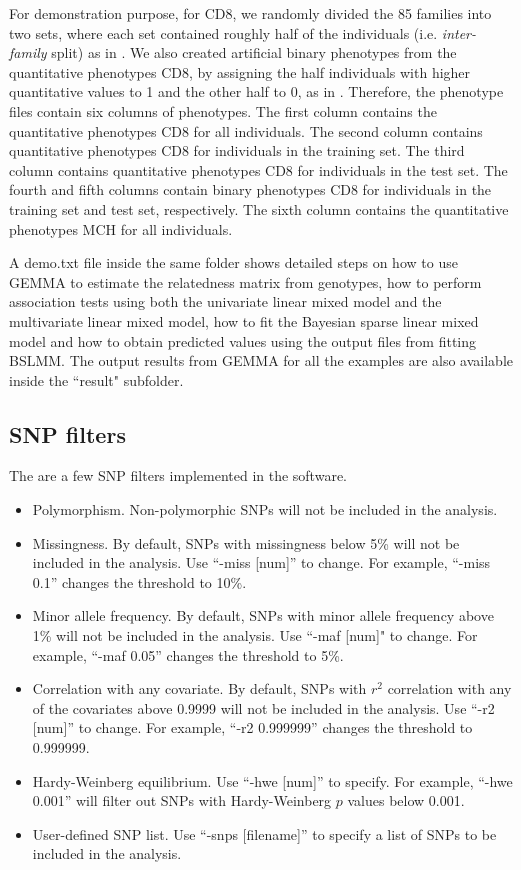 \documentclass[11pt]{article}
\begin{document}
For demonstration purpose, for CD8, we randomly divided the 85 families into two sets, where each set contained roughly half of the individuals (i.e. {\it inter-family} split) as in \cite{Zhou:2013}. We also created artificial binary phenotypes from the quantitative phenotypes CD8, by assigning the half individuals with higher quantitative values to 1 and the other half to 0, as in \cite{Zhou:2013}. Therefore, the phenotype files contain six columns of phenotypes. The first column contains the quantitative phenotypes CD8 for all individuals. The second column contains quantitative phenotypes CD8 for individuals in the training set. The third column contains quantitative phenotypes CD8 for individuals in the test set. The fourth and fifth columns contain binary phenotypes CD8 for individuals in the training set and test set, respectively. The sixth column contains the quantitative phenotypes MCH for all individuals.

A demo.txt file inside the same folder shows detailed steps on how to use GEMMA to estimate the relatedness matrix from genotypes, how to perform association tests using both the univariate linear mixed model and the multivariate linear mixed model, how to fit the Bayesian sparse linear mixed model and how to obtain predicted values using the output files from fitting BSLMM. The output results from GEMMA for all the examples are also available inside the ``result" subfolder. 



\subsection{SNP filters}
The are a few SNP filters implemented in the software.
\begin{itemize}
\item Polymorphism. Non-polymorphic SNPs will not be included in the analysis.
\item Missingness. By default, SNPs with missingness below 5\% will not be included in the analysis. Use ``-miss [num]'' to change. For example, ``-miss 0.1'' changes the threshold to 10\%.
\item Minor allele frequency. By default, SNPs with minor allele frequency above 1\% will not be included in the analysis. Use ``-maf [num]" to change. For example, ``-maf 0.05'' changes the threshold to 5\%.
\item Correlation with any covariate. By default, SNPs with $r^2$ correlation with any of the covariates above 0.9999 will not be included in the analysis. Use ``-r2 [num]'' to change. For example, ``-r2 0.999999'' changes the threshold to 0.999999.
\item Hardy-Weinberg equilibrium. Use ``-hwe [num]'' to specify. For example, ``-hwe 0.001'' will filter out SNPs with Hardy-Weinberg $p$ values below 0.001.
\item User-defined SNP list. Use ``-snps [filename]'' to specify a list of SNPs to be included in the analysis. 
\end{itemize}
\end{document}
